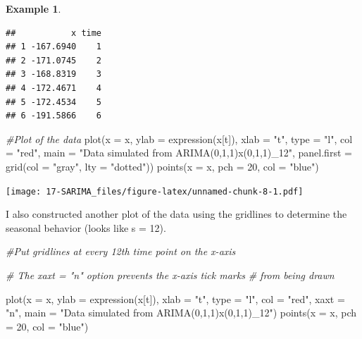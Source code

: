 \documentclass[
]{book}
\newenvironment{Shaded}{\begin{snugshade}}{\end{snugshade}}
\newcommand{\AttributeTok}[1]{\textcolor[rgb]{0.77,0.63,0.00}{#1}}
\newcommand{\CommentTok}[1]{\textcolor[rgb]{0.56,0.35,0.01}{\textit{#1}}}
\newcommand{\DecValTok}[1]{\textcolor[rgb]{0.00,0.00,0.81}{#1}}
\newcommand{\FunctionTok}[1]{\textcolor[rgb]{0.00,0.00,0.00}{#1}}
\newcommand{\NormalTok}[1]{#1}
\newcommand{\OtherTok}[1]{\textcolor[rgb]{0.56,0.35,0.01}{#1}}
\newcommand{\SpecialCharTok}[1]{\textcolor[rgb]{0.00,0.00,0.00}{#1}}
\newcommand{\StringTok}[1]{\textcolor[rgb]{0.31,0.60,0.02}{#1}}
\theoremstyle{definition}
\theoremstyle{definition}
\newtheorem{example}{Example}[chapter]
\theoremstyle{definition}
\theoremstyle{definition}
\theoremstyle{remark}
\begin{document}
\begin{example}
\begin{verbatim}
##           x time
## 1 -167.6940    1
## 2 -171.0745    2
## 3 -168.8319    3
## 4 -172.4671    4
## 5 -172.4534    5
## 6 -191.5866    6
\end{verbatim}

\begin{Shaded}
\end{Shaded}

\begin{Shaded}
\begin{Highlighting}[]
\CommentTok{\#Plot of the data}
\FunctionTok{plot}\NormalTok{(}\AttributeTok{x =}\NormalTok{ x, }\AttributeTok{ylab =} \FunctionTok{expression}\NormalTok{(x[t]), }\AttributeTok{xlab =} \StringTok{"t"}\NormalTok{, type }
    \OtherTok{=} \StringTok{"l"}\NormalTok{, }\AttributeTok{col =} \StringTok{"red"}\NormalTok{, }\AttributeTok{main =} \StringTok{"Data simulated from }
\StringTok{    ARIMA(0,1,1)x(0,1,1)\_12"}\NormalTok{, }\AttributeTok{panel.first =} \FunctionTok{grid}\NormalTok{(}\AttributeTok{col =} 
    \StringTok{"gray"}\NormalTok{, }\AttributeTok{lty =} \StringTok{"dotted"}\NormalTok{))}
\FunctionTok{points}\NormalTok{(}\AttributeTok{x =}\NormalTok{ x, }\AttributeTok{pch =} \DecValTok{20}\NormalTok{, }\AttributeTok{col =} \StringTok{"blue"}\NormalTok{)}
\end{Highlighting}
\end{Shaded}

\texttt{[image: 17-SARIMA\_files/figure-latex/unnamed-chunk-8-1.pdf]}

I also constructed another plot of the data using the gridlines to determine the seasonal behavior (looks like s = 12).

\begin{Shaded}
\begin{Highlighting}[]
\CommentTok{\#Put gridlines at every 12th time point on the x{-}axis}

\CommentTok{\# The xaxt = "n" option prevents the x{-}axis tick marks }
\CommentTok{\# from being drawn }

\FunctionTok{plot}\NormalTok{(}\AttributeTok{x =}\NormalTok{ x, }\AttributeTok{ylab =} \FunctionTok{expression}\NormalTok{(x[t]), }\AttributeTok{xlab =} \StringTok{"t"}\NormalTok{, }\AttributeTok{type =} 
    \StringTok{"l"}\NormalTok{, }\AttributeTok{col =} \StringTok{"red"}\NormalTok{, }\AttributeTok{xaxt =} \StringTok{"n"}\NormalTok{, }\AttributeTok{main =}  
    \StringTok{"Data simulated from ARIMA(0,1,1)x(0,1,1)\_12"}\NormalTok{)}
\FunctionTok{points}\NormalTok{(}\AttributeTok{x =}\NormalTok{ x, }\AttributeTok{pch =} \DecValTok{20}\NormalTok{, }\AttributeTok{col =} \StringTok{"blue"}\NormalTok{)}


\end{Highlighting}
\end{Shaded}
\end{example}
\end{document}

